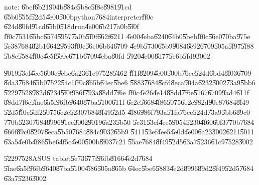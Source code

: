 note: \U{6bcf}\U{6b21}\U{904b}\U{884c}\U{5b8c}\U{5f8c}\U{8981}\U{91cd}%
\U{65b0}\U{555f}\U{52d5}\U{4e00}\U{500b}python\U{7684}interpreter\U{ff0c}%
\U{624d}\U{80fd}\U{91cd}\U{65b0}\U{518d}run\U{4e00}\U{6b21}\U{7a0b}\U{5f0f}%
\U{ff0c}\U{7531}\U{65bc}\U{6574}\U{5957}\U{7a0b}\U{5f0f}\U{662f}\U{6211}%
\U{4e00}\U{4eba}\U{6240}\U{64b0}\U{5beb}\U{ff0c}\U{56e0}\U{70ba}\U{975e}%
\U{5e38}\U{7684}\U{82b1}\U{6642}\U{9593}\U{ff0c}\U{56e0}\U{6b64}\U{6709}%
\U{4e9b}\U{5730}\U{65b9}\U{9084}\U{6c92}\U{6709}\U{505a}\U{5f97}\U{5f88}%
\U{5b8c}\U{5584}\U{ff0c}\U{4e5f}\U{5e0c}\U{671b}\U{6709}\U{4eba}\U{80fd}%
\U{5920}\U{4e00}\U{8d77}\U{5e6b}\U{5fd9}\U{3002}

\clearpage%

\U{9019}\U{53ef}\U{4ee5}\U{600e}\U{9ebc}\U{6a23}\U{61c9}\U{7528}\U{5462}%
\U{ff1f}\U{8209}\U{4e00}\U{500b}\U{76ee}\U{524d}\U{6bd4}\U{8f03}\U{6709}%
\U{8da3}\U{7684}\U{65b0}\U{7522}\U{54c1}\U{ff0c}\U{865b}\U{64ec}\U{5be6}%
\U{5883}\U{7684}\U{8cfd}\U{8eca}\U{904a}\U{6232}\U{3002}\U{73a9}\U{5bb6}%
\U{5229}\U{7528}\U{982d}\U{6234}\U{5f0f}\U{986f}\U{793a}\U{88dd}\U{7f6e}%
\U{ff0c}\U{4e26}\U{4e14}\U{88dd}\U{7f6e}\U{5167}\U{6709}\U{9ad4}\U{611f}%
\U{88dd}\U{7f6e}\U{5fae}\U{6a5f}\U{96fb}\U{9640}\U{87ba}\U{5100}\U{611f}%
\U{6e2c}\U{5668}\U{4f86}\U{5075}\U{6e2c}\U{982d}\U{90e8}\U{7684}\U{8f49}%
\U{52d5}\U{ff0c}\U{5df2}\U{5075}\U{6e2c}\U{5230}\U{7684}\U{8f49}\U{52d5}%
\U{4f86}\U{986f}\U{793a}\U{51fa}\U{76ee}\U{524d}\U{73a9}\U{5bb6}\U{89c0}%
\U{770b}\U{5230}\U{7684}\U{8996}\U{91ce}\U{3002}\U{9019}\U{6a23}\U{5b50}%
\U{5c31}\U{53ef}\U{4ee5}\U{9054}\U{5230}\U{4f60}\U{60f3}\U{770b}\U{7684}%
\U{666f}\U{89c0}\U{8207}\U{8eca}\U{5b50}\U{7684}\U{884c}\U{9032}\U{65b9}%
\U{5411}\U{53ef}\U{4ee5}\U{4e0d}\U{4e00}\U{6a23}\U{3002}\U{6211}\U{5011}%
\U{63a5}\U{4e0b}\U{4f86}\U{5be6}\U{4f5c}\U{4e00}\U{500b}\U{8f03}\U{7c21}%
\U{55ae}\U{7684}\U{8f49}\U{52d5}\U{63a7}\U{5236}\U{61c9}\U{7528}\U{3002}

\begin{case}
\U{5229}\U{7528}ASUS tablet\U{5e73}\U{677f}\U{96fb}\U{8166}\U{4e2d}\U{7684}%
\U{5fae}\U{6a5f}\U{96fb}\U{9640}\U{87ba}\U{5100}\U{4f86}\U{505a}\U{865b}%
\U{64ec}\U{5be6}\U{5883}\U{4e2d}\U{8996}\U{89d2}\U{8f49}\U{52d5}\U{7684}%
\U{63a7}\U{5236}\U{3002}
\end{case}

